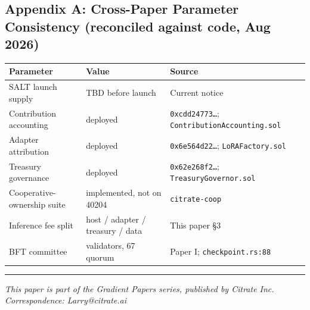 \subsection{Appendix A: Cross-Paper Parameter Consistency (reconciled
against code, Aug
2026)}\label{appendix-a-cross-paper-parameter-consistency-reconciled-against-code-aug-2026}

{\def\LTcaptype{none} %
\begin{longtable}[]{@{}
  >{\raggedright\arraybackslash}p{}
  >{\raggedright\arraybackslash}p{}
  >{\raggedright\arraybackslash}p{}@{}}
\toprule\noalign{}
\begin{minipage}[b]{\linewidth}\raggedright
Parameter
\end{minipage} & \begin{minipage}[b]{\linewidth}\raggedright
Value
\end{minipage} & \begin{minipage}[b]{\linewidth}\raggedright
Source
\end{minipage} \\
\midrule\noalign{}
\endhead
\bottomrule\noalign{}
\endlastfoot
SALT launch supply & TBD before launch & Current notice \\
Contribution accounting & deployed & \texttt{0xcdd24773…};
\texttt{ContributionAccounting.sol} \\
Adapter attribution & deployed & \texttt{0x6e564d22…};
\texttt{LoRAFactory.sol} \\
Treasury governance & deployed & \texttt{0x62e268f2…};
\texttt{TreasuryGovernor.sol} \\
Cooperative-ownership suite & implemented, not on 40204 &
\texttt{citrate-coop} \\
Inference fee split & host / adapter / treasury / data & This paper
§3 \\
BFT committee & 100 validators, 67 quorum & Paper I;
\texttt{checkpoint.rs:88} \\
\end{longtable}
}

\begin{center}\rule{0.5\linewidth}{0.5pt}\end{center}

\emph{This paper is part of the Gradient Papers series, published by
Citrate Inc.} \emph{Correspondence: Larry@citrate.ai}
